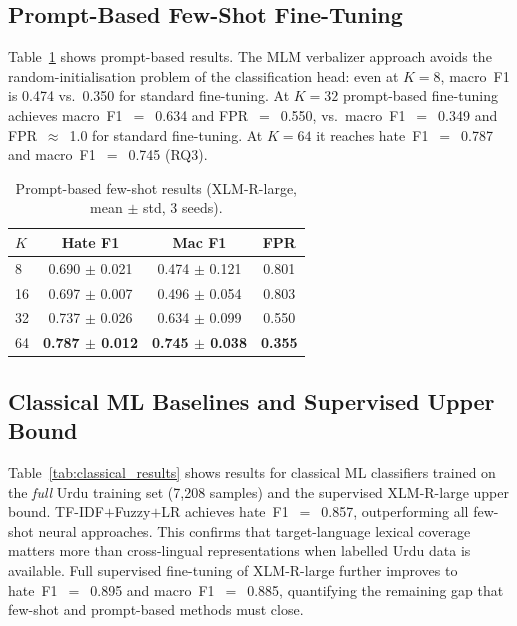 \documentclass{article}
\begin{document}
\subsection{Prompt-Based Few-Shot Fine-Tuning}

Table~\ref{tab:prompt_results} shows prompt-based results.
The MLM verbalizer approach avoids the random-initialisation problem of the
classification head: even at $K=8$, macro~F1 is 0.474 vs.\ 0.350 for standard
fine-tuning.
At $K=32$ prompt-based fine-tuning achieves macro~F1~$=$~0.634 and
FPR~$=$~0.550, vs.\ macro~F1~$=$~0.349 and FPR~$\approx$~1.0 for standard
fine-tuning.
At $K=64$ it reaches hate~F1~$=$~0.787 and macro~F1~$=$~0.745 (RQ3).

\begin{table}[h]
\centering
\caption{Prompt-based few-shot results (XLM-R-large, mean $\pm$ std, 3 seeds).}
\label{tab:prompt_results}
\vskip 0.05in
\begin{small}
\begin{tabular}{lccc}
\toprule
$K$ & Hate F1 & Mac F1 & FPR \\
\midrule
8  & 0.690 $\pm$ 0.021 & 0.474 $\pm$ 0.121 & 0.801 \\
16 & 0.697 $\pm$ 0.007 & 0.496 $\pm$ 0.054 & 0.803 \\
32 & 0.737 $\pm$ 0.026 & 0.634 $\pm$ 0.099 & 0.550 \\
64 & \textbf{0.787 $\pm$ 0.012} & \textbf{0.745 $\pm$ 0.038} & \textbf{0.355} \\
\bottomrule
\end{tabular}
\end{small}
\end{table}

\subsection{Classical ML Baselines and Supervised Upper Bound}

Table~\ref{tab:classical_results} shows results for classical ML classifiers
trained on the \emph{full} Urdu training set (7{,}208 samples) and the supervised
XLM-R-large upper bound.
TF-IDF$+$Fuzzy$+$LR achieves hate~F1~$=$~0.857, outperforming all few-shot
neural approaches.
This confirms that target-language lexical coverage matters more than cross-lingual
representations when labelled Urdu data is available.
Full supervised fine-tuning of XLM-R-large further improves to hate~F1~$=$~0.895
and macro~F1~$=$~0.885, quantifying the remaining gap that few-shot and
prompt-based methods must close.
\end{document}
